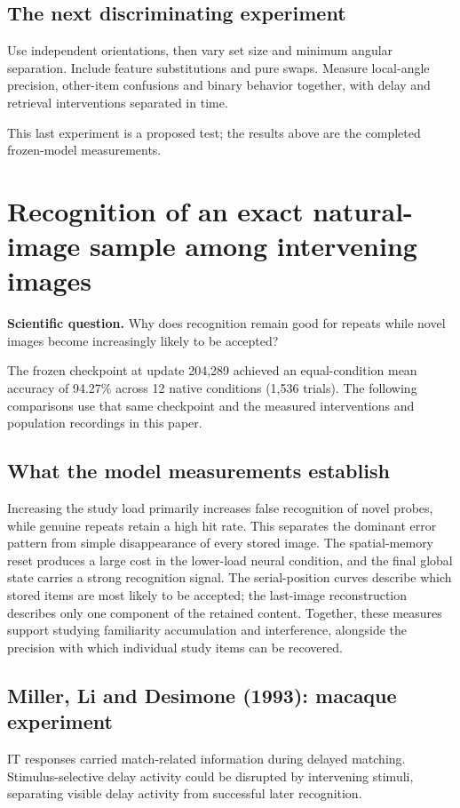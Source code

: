 \documentclass[11pt]{article}
\begin{document}
\subsection{The next discriminating experiment}
Use independent orientations, then vary set size and minimum angular separation. Include feature substitutions and pure swaps. Measure local-angle precision, other-item confusions and binary behavior together, with delay and retrieval interventions separated in time.

This last experiment is a proposed test; the results above are the completed frozen-model measurements.
\clearpage\section{Recognition of an exact natural-image sample among intervening images}
\textbf{Scientific question.} Why does recognition remain good for repeats while novel images become increasingly likely to be accepted?

The frozen checkpoint at update 204,289 achieved an equal-condition mean accuracy of 94.27\% across 12 native conditions (1,536 trials). The following comparisons use that same checkpoint and the measured interventions and population recordings in this paper.

\subsection{What the model measurements establish}
Increasing the study load primarily increases false recognition of novel probes, while genuine repeats retain a high hit rate. This separates the dominant error pattern from simple disappearance of every stored image. The spatial-memory reset produces a large cost in the lower-load neural condition, and the final global state carries a strong recognition signal. The serial-position curves describe which stored items are most likely to be accepted; the last-image reconstruction describes only one component of the retained content. Together, these measures support studying familiarity accumulation and interference, alongside the precision with which individual study items can be recovered.

\subsection{Miller, Li and Desimone (1993): macaque experiment}
IT responses carried match-related information during delayed matching. Stimulus-selective delay activity could be disrupted by intervening stimuli, separating visible delay activity from successful later recognition. \cite{bio_miller93}
\end{document}
